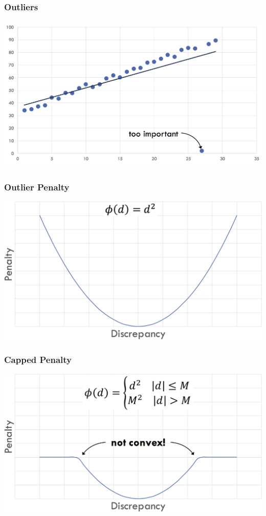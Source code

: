 \subsection{}

\begin{frame}
  \frametitle{Outliers}
  \includegraphics[scale=0.32]{pics/lpo.png}

\end{frame}

\subsection{}
\begin{frame}


  \frametitle{Outlier Penalty}

  \includegraphics[scale=0.32]{pics/pen1.png}


\end{frame}

\begin{frame}
  \frametitle{Capped Penalty}
  \includegraphics[scale=0.32]{pics/pen2.png}
\end{frame}

